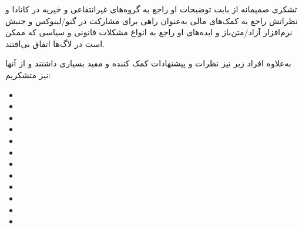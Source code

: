 تشکری صمیمانه از
بابت توضیحات او راجع به گروه‌های غیرانتفاعی و خیریه در کانادا و نظراتش راجع به کمک‌های مالی به‌عنوان
راهی برای مشارکت در گنو/لینوکس و جنبش نرم‌افزار آزاد/متن‌باز و ایده‌های او راجع به انواع مشکلات قانونی
و سیاسی که ممکن است در لاگ‌ها اتفاق بی‌افتند.

به‌علاوه افراد زیر نیز نظرات و پیشنهادات کمک کننده و مفید بسیاری داشتند و از آنها نیز متشکریم:

\begin{itemize}
\item {}
\item {}
\item {}
\item {}
\item {}
\item {}
\item {}
\item {}
\item {}
\item {}
\item {}
\item {}
\end{itemize}

